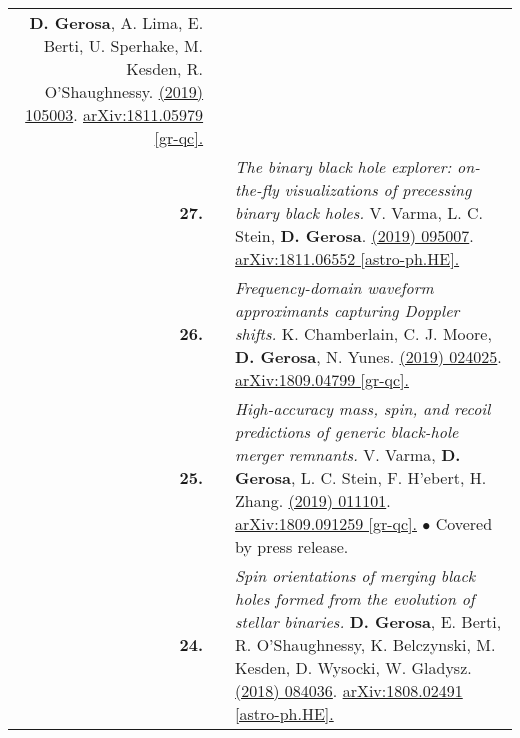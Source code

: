 {\begin{longtable}{rp{0.3cm}p{15.8cm}}
\textbf{D. Gerosa}, A. Lima, E. Berti, U. Sperhake, M. Kesden, R. O'Shaughnessy.
\newline{}
\href{https://iopscience.iop.org/article/10.1088/1361-6382/ab14ae/meta}{\cqg 36 (2019) 105003}. \href{https://arxiv.org/abs/1811.05979}{arXiv:1811.05979 [gr-qc].}
\vspace{0.09cm}\\
%
\textbf{27.} & & \textit{The binary black hole explorer: on-the-fly visualizations of precessing binary black holes.}
\newline{}
V. Varma, L. C. Stein, \textbf{D. Gerosa}.
\newline{}
\href{https://iopscience.iop.org/article/10.1088/1361-6382/ab0ee9/meta}{\cqg 36 (2019) 095007}. \href{https://arxiv.org/abs/1811.06552}{arXiv:1811.06552 [astro-ph.HE].}
\vspace{0.09cm}\\
%
\textbf{26.} & & \textit{Frequency-domain waveform approximants capturing Doppler shifts.}
\newline{}
K. Chamberlain, C. J. Moore, \textbf{D. Gerosa}, N. Yunes.
\newline{}
\href{https://journals.aps.org/prd/abstract/10.1103/PhysRevD.99.024025}{\prd 99 (2019) 024025}. \href{https://arxiv.org/abs/1809.04799}{arXiv:1809.04799 [gr-qc].}
\vspace{0.09cm}\\
%
\textbf{25.} & & \textit{High-accuracy mass, spin, and recoil predictions of generic black-hole merger remnants.}
\newline{}
V. Varma, \textbf{D. Gerosa}, L. C. Stein, F. H'ebert, H. Zhang.
\newline{}
\href{https://journals.aps.org/prl/abstract/10.1103/PhysRevLett.122.011101}{\prl 122 (2019) 011101}. \href{https://arxiv.org/abs/1809.091259}{arXiv:1809.091259 [gr-qc].}
\newline{}
\textcolor{color1}{$\bullet$} Covered by press release.
\vspace{0.09cm}\\
%
\textbf{24.} & & \textit{Spin orientations of merging black holes formed from the evolution of stellar binaries.}
\newline{}
\textbf{D. Gerosa}, E. Berti, R. O'Shaughnessy, K. Belczynski, M. Kesden, D. Wysocki, W. Gladysz.
\newline{}
\href{https://journals.aps.org/prd/abstract/10.1103/PhysRevD.98.084036}{\prd 98 (2018) 084036}. \href{https://arxiv.org/abs/1808.02491}{arXiv:1808.02491 [astro-ph.HE].}
\vspace{0.09cm}\\

\end{longtable}}
